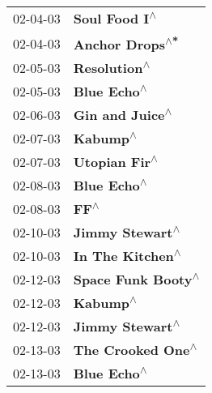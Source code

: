 \begin{supertabular}{p{0.25\columnwidth}p{0.75\columnwidth}}
 02-04-03 &                                                              \textbf{Soul Food I\textsuperscript{$\wedge$}} \\
 02-04-03 &                                                            \textbf{Anchor Drops\textsuperscript{$\wedge$*}} \\
 02-05-03 &                                                               \textbf{Resolution\textsuperscript{$\wedge$}} \\
 02-05-03 &                                                                \textbf{Blue Echo\textsuperscript{$\wedge$}} \\
 02-06-03 &                                                            \textbf{Gin and Juice\textsuperscript{$\wedge$}} \\
 02-07-03 &                                                                   \textbf{Kabump\textsuperscript{$\wedge$}} \\
 02-07-03 &                                                              \textbf{Utopian Fir\textsuperscript{$\wedge$}} \\
 02-08-03 &                                                                \textbf{Blue Echo\textsuperscript{$\wedge$}} \\
 02-08-03 &                                                                       \textbf{FF\textsuperscript{$\wedge$}} \\
 02-10-03 &                                                            \textbf{Jimmy Stewart\textsuperscript{$\wedge$}} \\
 02-10-03 &                                                           \textbf{In The Kitchen\textsuperscript{$\wedge$}} \\
 02-12-03 &                                                         \textbf{Space Funk Booty\textsuperscript{$\wedge$}} \\
 02-12-03 &                                                                   \textbf{Kabump\textsuperscript{$\wedge$}} \\
 02-12-03 &                                                            \textbf{Jimmy Stewart\textsuperscript{$\wedge$}} \\
 02-13-03 &                                                          \textbf{The Crooked One\textsuperscript{$\wedge$}} \\
 02-13-03 &                                                                \textbf{Blue Echo\textsuperscript{$\wedge$}} \\

\end{supertabular}
